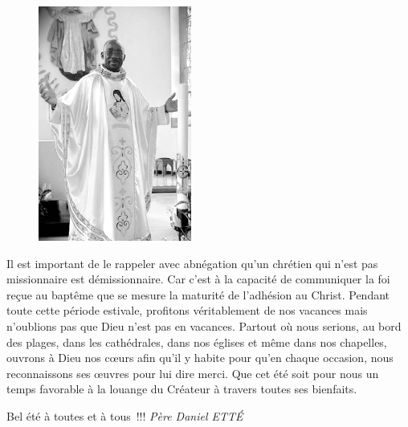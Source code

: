 \begin{figure}
\vspace{-0.4cm}
	\includegraphics[scale=1.20]{../images/standing_daniel}
\end{figure}
Il est important de le rappeler avec abnégation qu’un chrétien qui n’est pas missionnaire est démissionnaire. Car c’est à la capacité de communiquer la foi reçue au baptême que se mesure la maturité de l’adhésion au Christ.
Pendant toute cette période estivale, profitons véritablement de nos vacances mais n’oublions pas que Dieu n’est pas en vacances. Partout où nous serions, au bord des plages, dans les cathédrales, dans nos églises et même dans nos chapelles, ouvrons à Dieu nos cœurs afin qu’il y habite pour qu’en chaque occasion, nous reconnaissons ses œuvres pour lui dire merci. Que cet été soit pour nous un temps favorable à la louange du Créateur à travers toutes ses bienfaits.

\begin{flushright}
Bel été à toutes et à tous !!!
\textit{Père  Daniel  ETTÉ}
\end{flushright}

